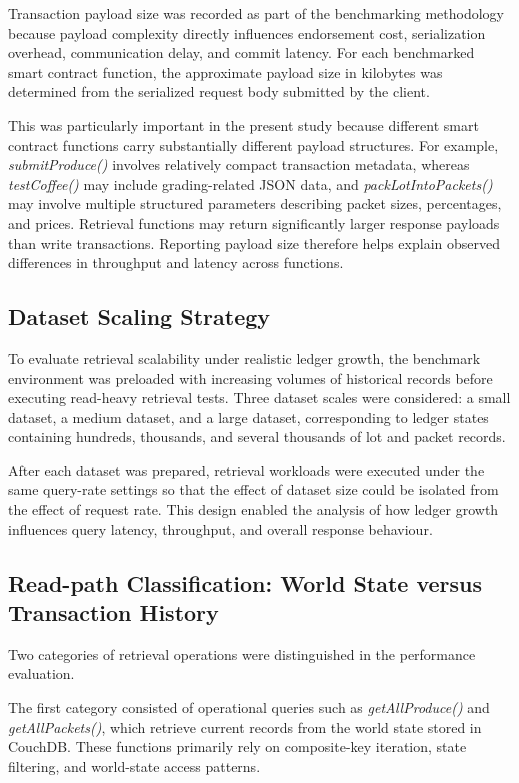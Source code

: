 \documentclass[12pt]{article}
\begin{document}
	Transaction payload size was recorded as part of the benchmarking methodology because payload complexity directly influences endorsement cost, serialization overhead, communication delay, and commit latency. For each benchmarked smart contract function, the approximate payload size in kilobytes was determined from the serialized request body submitted by the client.
	
	This was particularly important in the present study because different smart contract functions carry substantially different payload structures. For example, \textit{submitProduce()} involves relatively compact transaction metadata, whereas \textit{testCoffee()} may include grading-related JSON data, and \textit{packLotIntoPackets()} may involve multiple structured parameters describing packet sizes, percentages, and prices. Retrieval functions may return significantly larger response payloads than write transactions. Reporting payload size therefore helps explain observed differences in throughput and latency across functions. 
	
	
	\subsection{Dataset Scaling Strategy}
	
	To evaluate retrieval scalability under realistic ledger growth, the benchmark environment was preloaded with increasing volumes of historical records before executing read-heavy retrieval tests. Three dataset scales were considered: a small dataset, a medium dataset, and a large dataset, corresponding to ledger states containing hundreds, thousands, and several thousands of lot and packet records.
	
	After each dataset was prepared, retrieval workloads were executed under the same query-rate settings so that the effect of dataset size could be isolated from the effect of request rate. This design enabled the analysis of how ledger growth influences query latency, throughput, and overall response behaviour. 
	
	\subsection{Read-path Classification: World State versus Transaction History}
	
	Two categories of retrieval operations were distinguished in the performance evaluation.
	
	The first category consisted of operational queries such as \textit{getAllProduce()} and 
	\textit{getAllPackets()}, which retrieve current records from the world state stored in CouchDB. These functions primarily rely on composite-key iteration, state filtering, and world-state access patterns.
	
\end{document}
